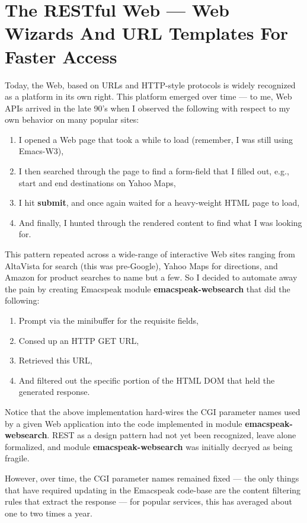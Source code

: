 \documentclass[11pt]{article}
\begin{document}
\section{The RESTful Web —  Web Wizards And URL Templates For Faster Access}
\label{sec-14}

Today, the Web, based on URLs and HTTP-style protocols is widely
recognized as a platform in its own right. This platform emerged
over time — to me, Web APIs arrived in the late 90's when I
observed the following with respect to my own behavior on many
popular sites:

\begin{enumerate}
\item I opened a Web page that took a while to load (remember,  I
was still using Emacs-W3),
\item I then searched through the page to find a form-field that
I filled out, e.g., start and end destinations on Yahoo
Maps,
\item I hit \textbf{submit}, and once again waited for a heavy-weight
HTML page to load,
\item And finally, I hunted through the rendered content to find
what I was looking for.
\end{enumerate}

This pattern repeated across a wide-range of interactive Web
sites ranging from AltaVista for search (this was pre-Google),
Yahoo Maps for directions, and Amazon for product searches to
name but a few. So I decided to automate away the pain by
creating Emacspeak module \textbf{emacspeak-websearch} that did the
following:

\begin{enumerate}
\item Prompt via the minibuffer for the requisite fields,
\item Consed up an HTTP GET URL,
\item Retrieved this URL,
\item And filtered out the specific portion of the HTML  DOM that
held the generated response.
\end{enumerate}

Notice that the above implementation hard-wires the CGI parameter
names used by a given Web application into the code implemented
in module \textbf{emacspeak-websearch}. REST as a design pattern had not
yet been recognized, leave alone formalized, and module
\textbf{emacspeak-websearch} was initially decryed as being fragile.

However, over time, the CGI parameter names remained fixed — the
 only things that have required updating in the Emacspeak
 code-base are the content filtering rules that extract the
 response — for popular services, this has averaged about one to
 two times a year.
\end{document}
